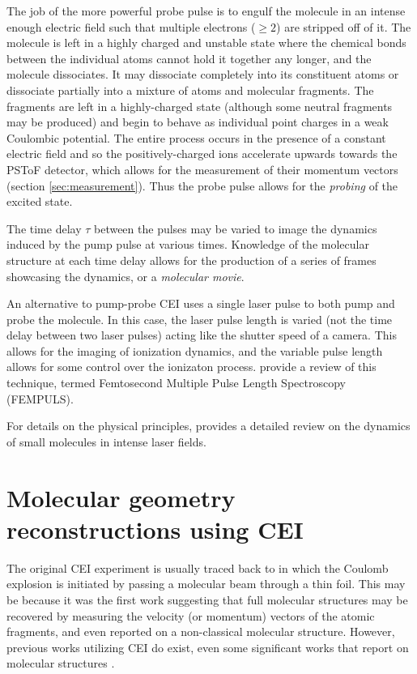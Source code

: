 The job of the more powerful probe pulse is to engulf the molecule in an intense enough electric field such that multiple electrons ($\ge2$) are stripped off of it. The molecule is left in a highly charged and unstable state where the chemical bonds between the individual atoms cannot hold it together any longer, and the molecule dissociates. It may dissociate completely into its constituent atoms or dissociate partially into a mixture of atoms and molecular fragments. The fragments are left in a highly-charged state (although some neutral fragments may be produced) and begin to behave as individual point charges in a weak Coulombic potential. The entire process occurs in the presence of a constant electric field and so the positively-charged ions accelerate upwards towards the PSToF detector, which allows for the measurement of their momentum vectors (section \ref{sec:measurement}). Thus the probe pulse allows for the \emph{probing} of the excited state.

The time delay $\tau$ between the pulses may be varied to image the dynamics induced by the pump pulse at various times. Knowledge of the molecular structure at each time delay allows for the production of a series of frames showcasing the dynamics, or a \emph{molecular movie}.

An alternative to pump-probe CEI uses a single laser pulse to both pump and probe the molecule. In this case, the laser pulse length is varied (not the time delay between two laser pulses) acting like the shutter speed of a camera. This allows for the imaging of ionization dynamics, and the variable pulse length allows for some control over the ionizaton process.  \citet{Karimi13} provide a review of this technique, termed Femtosecond Multiple Pulse Length Spectroscopy (FEMPULS).

For details on the physical principles, \citet{Posthumus04} provides a detailed review on the dynamics of small molecules in intense laser fields.

\section{Molecular geometry reconstructions using CEI}
The original CEI experiment is usually traced back to \citet{Vager89} in which the Coulomb explosion is initiated by passing a molecular beam through a thin foil. This may be because it was the first work suggesting that full molecular structures may be recovered by measuring the velocity (or momentum) vectors of the atomic fragments, and even reported on a non-classical molecular structure. However, previous works utilizing CEI do exist, even some significant works that report on molecular structures \citep{Kanter79}.

